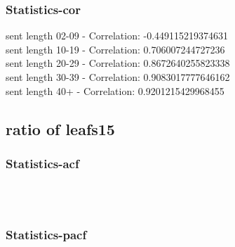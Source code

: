 \documentclass{article}%
\begin{document}
%
\newpage%
\subsubsection{Statistics{-}cor}%
\label{ssubsec:Statistics{-}cor}%
\noindent%
sent length 02-09 - Correlation: -0.449115219374631\\%
sent length 10-19 - Correlation: 0.706007244727236\\%
sent length 20-29 - Correlation: 0.8672640255823338\\%
sent length 30-39 - Correlation: 0.9083017777646162\\%
sent length 40+ - Correlation: 0.9201215429968455\\

%
\newpage

%
\subsection{ratio of leafs15}%
\label{subsec:ratioofleafs15}%
\subsubsection{Statistics{-}acf}%
\label{ssubsec:Statistics{-}acf}%


\begin{figure}[ht]%
\centering%
\setlength{\abovecaptionskip}{-35pt}%
%
%
\\%
%
%
\\%
%
\end{figure}

%
\newpage%
\subsubsection{Statistics{-}pacf}%
\label{ssubsec:Statistics{-}pacf}%
\end{document}

